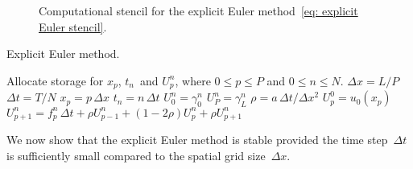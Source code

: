 \begin{figure}
\caption{Computational stencil for the explicit Euler 
method~\eqref{eq: explicit Euler stencil}.}
\label{fig: explicit Euler stencil}
\begin{center}
\end{center}
\end{figure}

\begin{algorithm}
\caption{Explicit Euler method.}
\label{alg: explicit Euler}
\begin{algorithmic}
\State Allocate storage for $x_p$, $t_n$~and $U^n_p$, where $0\le p\le P$ and 
$0\le n\le N$.
\State $\Delta x=L/P$ 
\State$\Delta t=T/N$
    \State $x_p=p\,\Delta x$
\EndFor
{}
    \State $t_n=n\,\Delta t$
    \State $U^n_0=\gamma_0^n$
    \State $U^n_P=\gamma_L^n$
\EndFor
\State $\rho=a\,\Delta t/\Delta x^2$
    \State $U^0_p=u_0(x_p)$
\EndFor
{}
        \State $U^n_{p+1}=f^n_p\,\Delta t
                +\rho U^n_{p-1}+(1-2\rho)U^n_p+\rho U^n_{p+1}$
    \EndFor                
\EndFor
\end{algorithmic}
\end{algorithm}

We now show that the explicit Euler method is stable provided the time 
step~$\Delta t$ is sufficiently small compared to the spatial grid 
size~$\Delta x$.

